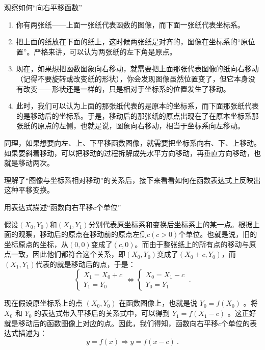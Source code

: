 \begin{example}{观察如何“向右平移函数”}
\begin{enumerate}
\item 你有两张纸——上面一张纸代表函数的图像，而下面一张纸代表坐标系。
\item 把上面的纸放在下面的纸上，这时候两张纸是对齐的，图像在坐标系的“原位置”。严格来讲，可以认为两张纸的左下角是原点。
\item 现在，如果想把函数图象向右移动，就需要把上面那张代表图像的纸向右移动（记得不要旋转或改变纸的形状），你会发现图像虽然位置变了，但它本身没有改变——形状还是一样的，只是相对于坐标系的位置发生了移动。
\item 此时，我们可以认为上面的那张纸代表的是原本的坐标系，而下面那张纸代表的是移动后的坐标系。于是，移动后的那张纸的原点出现在了在原本坐标系那张纸的原点的左侧，也就是说，图象向右移动，相当于坐标系向左移动。
\end{enumerate}
\end{example}

同理，如果想要向左、上、下平移函数图像，就需要把坐标系向右、下、上移动。如果要斜着移动，可以把移动的过程拆解成先水平方向移动，再垂直方向移动，也就是移动两次。

理解了“图像与坐标系相对移动”的关系后，接下来看看如何在函数表达式上反映出这种平移变换。

\begin{example}{用表达式描述“函数向右平移$c$个单位”}

假设$(X_0,Y_0)$和$(X_1,Y_1)$分别代表原坐标系和变换后坐标系上的某一点。根据上面的观察，移动后的原点在移动前的原点左侧$c(c>0)$个单位。也就是说，旧的坐标原点的坐标，从$(0,0)$变成了$(c,0)$。而由于整张纸上的所有点的移动与原点一致，因此他们都符合这个关系，即$(X_0,Y_0)$变成了$(X_0+c,Y_0)$，而$(X_1,Y_1)$代表的就是移动后的点，于是：
\begin{equation}
\begin{cases}
X_1=X_0+c\\
Y_1=Y_0
\end{cases}\iff
\begin{cases}
X_0=X_1-c\\
Y_0=Y_1
\end{cases}~.
\end{equation}

现在假设原坐标系上的点  $(X_0, Y_0)$  在函数图像上，也就是说  $Y_0 = f(X_0)$ 。将  $X_0$  和  $Y_0$  的表达式带入平移后的关系式中，可以得到  $Y_1 = f(X_1 - c)$ 。这正好就是移动后的函数图像上对应的点。因此，我们得知，函数向右平移$c$个单位的表达式描述为：
\begin{equation}
y=f(x)\Rightarrow y=f(x-c)~.
\end{equation}
\end{example}


